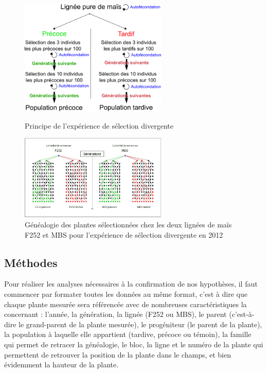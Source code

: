 \documentclass[12pt,a4paper]{article}
\begin{document}
			\begin{figure}[h]
				
				\begin{minipage}[t]{0.45\textwidth}
					\centering
					\includegraphics[width=7cm]{selec_div.png} %
					\caption{Principe de l'expérience de sélection divergente}
					\label{selec.div}
				\end{minipage}
				\quad
				\begin{minipage}[t]{0.45\textwidth}
					\centering
					\includegraphics[width=7cm]{carte_gen.jpg} %
					\caption{Généalogie des plantes sélectionnées chez les deux lignées de maïs F252 et MBS pour l'expérience de sélection divergente en 2012}
					\label{carte_gen}
				\end{minipage}
					


				
			\end{figure}
			
		\subsection{Méthodes}
			
			Pour réaliser les analyses nécessaires à la confirmation de nos hypothèses, il faut commencer par formater toutes les données au même format, c'est à dire que chaque plante mesurée sera référencée avec de nombreuses caractéristiques la concernant : l'année, la génération, la lignée (F252 ou MBS), le parent (c'est-à-dire le \og grand-parent \fg de la plante mesurée), le progéniteur (le parent de la plante), la population à laquelle elle appartient (tardive, précoce ou témoin), la famille qui permet de retracer la généalogie, le bloc, la ligne et le numéro de la plante qui permettent de retrouver la position de la plante dans le champs, et bien évidemment la hauteur de la plante.
			
\end{document}
